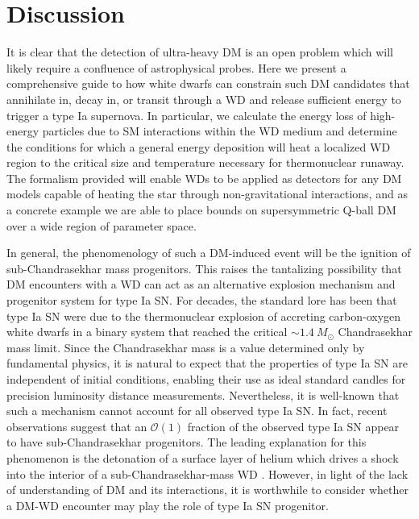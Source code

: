 \documentclass[preprintnumbers,amsmath,amssymb,prd, superscriptaddress,twocolumn]{revtex4}
\newcommand{\OO}{\mathcal{O}}
\begin{document}
\section{Discussion}
\label{sec:Discussion}

It is clear that the detection of ultra-heavy DM is an open problem which will likely require a confluence of astrophysical probes.
Here we present a comprehensive guide to how white dwarfs can constrain such DM candidates that annihilate in, decay in, or transit through a WD and release sufficient energy to trigger a type Ia supernova.
In particular, we calculate the energy loss of high-energy particles due to SM interactions within the WD medium and determine the conditions for which a general energy deposition will heat a localized WD region to the critical size and temperature necessary for thermonuclear runaway.
The formalism provided will enable WDs to be applied as detectors for any DM models capable of heating the star through non-gravitational interactions, and as a concrete example we are able to place bounds on supersymmetric Q-ball DM over a wide region of parameter space.

In general, the phenomenology of such a DM-induced event will be the ignition of sub-Chandrasekhar mass progenitors.
This raises the tantalizing possibility that DM encounters with a WD can act as an alternative explosion mechanism and progenitor system for type Ia SN.
For decades, the standard lore has been that type Ia SN were due to the thermonuclear explosion of accreting carbon-oxygen white dwarfs in a binary system that reached the critical $\sim 1.4 ~M_{\odot}$ Chandrasekhar mass limit.
Since the Chandrasekhar mass is a value determined only by fundamental physics, it is natural to expect that the properties of type Ia SN are independent of initial conditions, enabling their use as ideal standard candles for precision luminosity distance measurements.
Nevertheless, it is well-known that such a mechanism cannot account for all observed type Ia SN.
In fact, recent observations \cite{Scalzo:2014sap, Scalzo:2014wxa} suggest that an $\OO(1)$ fraction of the observed type Ia SN appear to have sub-Chandrasekhar progenitors.
The leading explanation for this phenomenon is the detonation of a surface layer of helium which drives a shock into the interior of a sub-Chandrasekhar-mass WD \cite{Woosley1994,Fink:2007fv}.
However, in light of the lack of understanding of DM and its interactions, it is worthwhile to consider whether a DM-WD encounter may play the role of type Ia SN progenitor.
\end{document}
